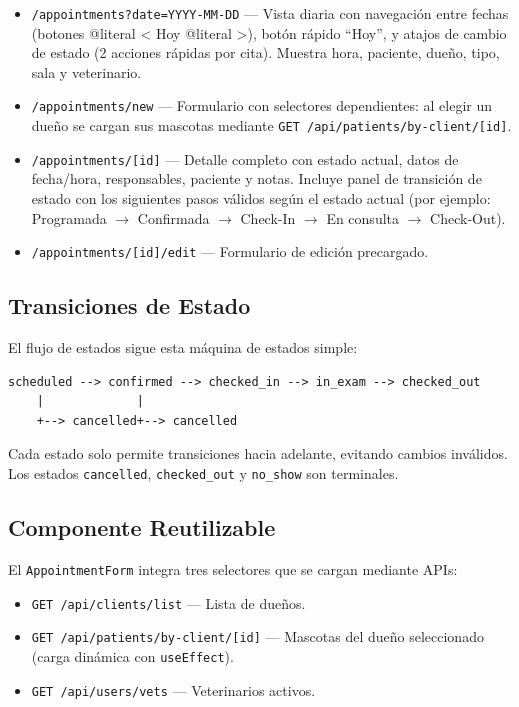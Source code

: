 \documentclass[12pt,a4paper]{article}
\begin{document}
\begin{itemize}[leftmargin=*]
    \item \texttt{/appointments?date=YYYY-MM-DD} --- Vista diaria con
          navegación entre fechas (botones {@literal <} Hoy {@literal >}),
          botón rápido ``Hoy'', y atajos de cambio de estado (2 acciones
          rápidas por cita). Muestra hora, paciente, dueño, tipo, sala y
          veterinario.
    \item \texttt{/appointments/new} --- Formulario con selectores
          dependientes: al elegir un dueño se cargan sus mascotas
          mediante \texttt{GET /api/patients/by-client/[id]}.
    \item \texttt{/appointments/[id]} --- Detalle completo con estado
          actual, datos de fecha/hora, responsables, paciente y notas.
          Incluye panel de transición de estado con los siguientes pasos
          válidos según el estado actual (por ejemplo: Programada
          $\to$ Confirmada $\to$ Check-In $\to$ En consulta $\to$ Check-Out).
    \item \texttt{/appointments/[id]/edit} --- Formulario de edición precargado.
\end{itemize}

\subsection{Transiciones de Estado}

El flujo de estados sigue esta máquina de estados simple:

\begin{verbatim}
scheduled --> confirmed --> checked_in --> in_exam --> checked_out
    |             |
    +--> cancelled+--> cancelled
\end{verbatim}

Cada estado solo permite transiciones hacia adelante, evitando cambios
inválidos. Los estados \texttt{cancelled}, \texttt{checked\_out} y
\texttt{no\_show} son terminales.

\subsection{Componente Reutilizable}

El \texttt{AppointmentForm} integra tres selectores que se cargan mediante
APIs:

\begin{itemize}[leftmargin=*]
    \item \texttt{GET /api/clients/list} --- Lista de dueños.
    \item \texttt{GET /api/patients/by-client/[id]} --- Mascotas del dueño
          seleccionado (carga dinámica con \texttt{useEffect}).
    \item \texttt{GET /api/users/vets} --- Veterinarios activos.
\end{itemize}
\end{document}
